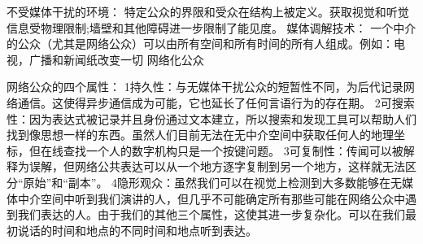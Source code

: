 不受媒体干扰的环境：
特定公众的界限和受众在结构上被定义。获取视觉和听觉信息受物理限制;墙壁和其他障碍进一步限制了能见度。
媒体调解技术：
一个中介的公众（尤其是网络公众）可以由所有空间和所有时间的所有人组成。例如：电视，广播和新闻纸改变一切
网络化公众

网络公众的四个属性：
1持久性：与无媒体干扰公众的短暂性不同，为后代记录网络通信。这使得异步通信成为可能，它也延长了任何言语行为的存在期。
2可搜索性：因为表达式被记录并且身份通过文本建立，所以搜索和发现工具可以帮助人们找到像思想一样的东西。虽然人们目前无法在无中介空间中获取任何人的地理坐标，但在线查找一个人的数字机构只是一个按键问题。
3可复制性：传闻可以被解释为误解，但网络公共表达可以从一个地方逐字复制到另一个地方，这样就无法区分“原始”和“副本”。
4隐形观众：虽然我们可以在视觉上检测到大多数能够在无媒体中介空间中听到我们演讲的人，但几乎不可能确定所有那些可能在网络公众中遇到我们表达的人。由于我们的其他三个属性，这使其进一步复杂化。可以在我们最初说话的时间和地点的不同时间和地点听到表达。

